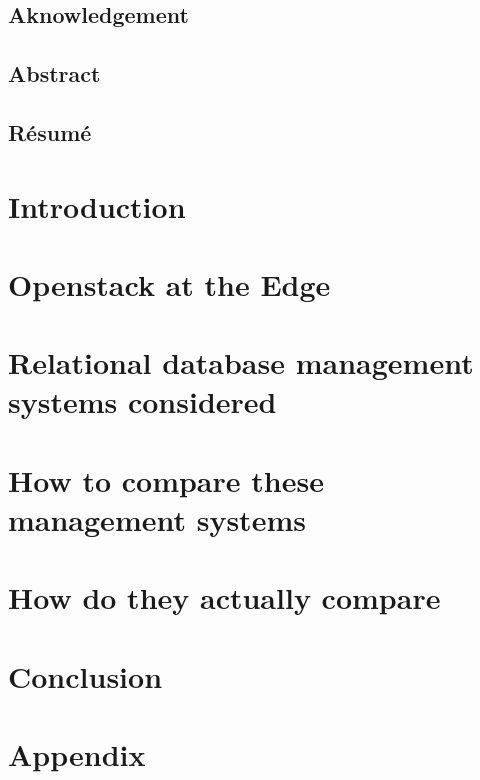 \documentclass[a4paper, 10pt, titlepage]{report}
\begin{document}
\clearpage
\tableofcontents
\newpage

\section*{Aknowledgement}

\section*{Abstract}

\section*{Résumé}

\chapter*{Introduction}




\chapter{Openstack at the Edge}





\chapter{Relational database management systems considered}




\chapter{How to compare these management systems}




\chapter{How do they actually compare}



\chapter*{Conclusion}



\clearpage
{}
\chapter*{Appendix}
\label{sec:appendix}



\clearpage
{}
{}

\printbibliography[title={Book references},type=book]
\printbibliography[title={Article references},type=article]
\printbibliography[title={Other references}, nottype=article, nottype=book]
\end{document}
